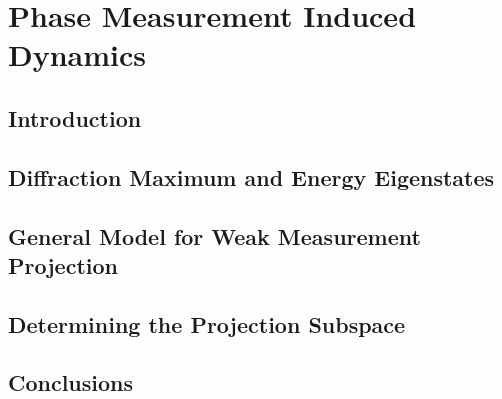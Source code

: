 
\chapter{Phase Measurement Induced Dynamics}

\ifpdf
    \graphicspath{{Chapter6/Figs/Raster/}{Chapter6/Figs/PDF/}{Chapter6/Figs/}}
\else
    \graphicspath{{Chapter6/Figs/Vector/}{Chapter6/Figs/}}
\fi


\section{Introduction}

\section{Diffraction Maximum and Energy Eigenstates}

\section{General Model for Weak Measurement Projection}

\section{Determining the Projection Subspace}

\section{Conclusions}